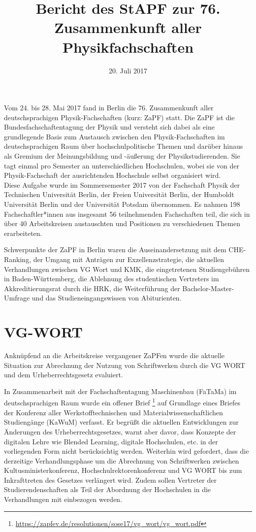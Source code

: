 \documentclass[a4paper]{article}
\begin{document}
	
\title{Bericht des StAPF zur 76. Zusammenkunft aller Physikfachschaften}
\date{20. Juli 2017}

\maketitle

Vom 24. bis 28. Mai 2017 fand in Berlin die 76. Zusammenkunft
aller deutschsprachigen Physik-Fachschaften (kurz: ZaPF) statt.  Die ZaPF ist
die Bundesfachschaftentagung der Physik und versteht sich dabei als eine
grundlegende Basis zum Austausch zwischen den Physik-Fachschaften im
deutschsprachigen Raum über hochschulpolitische Themen und darüber hinaus als
Gremium der Meinungsbildung und -äußerung der Physikstudierenden. Sie tagt
einmal pro Semester an unterschiedlichen Hochschulen, wobei sie von der
Physik-Fachschaft der ausrichtenden Hochschule selbst organisiert wird. 
\\

Diese Aufgabe wurde im Sommersemester 2017 von der Fachschaft Physik der Technischen Universität Berlin, der Freien Universität Berlin, der Humboldt Universität Berlin und der Universität Potsdam übernommen. 
Es nahmen 198 Fachschaftler*innen aus insgesamt 56 teilnehmenden Fachschaften teil, 
die sich in über 40 Arbeitskreisen austauschten und Positionen zu verschiedenen Themen erarbeiteten.

Schwerpunkte der ZaPF in Berlin waren die Auseinandersetzung mit dem CHE-Ranking, der Umgang mit Anträgen zur Exzellenzstrategie, die aktuellen Verhandlungen zwischen VG Wort und KMK, die eingetretenen Studiengebühren in Baden-Württemberg, die Ablehnung des studentischen Vertreters im Akkreditierungsrat durch die HRK, 
die Weiterführung der Bachelor-Master-Umfrage und das Studieneingangswissen von Abiturienten.

\newpage

\section*{VG-WORT}
Anknüpfend an die Arbeitskreise vergangener ZaPFen wurde die aktuelle Situation zur Abrechnung der Nutzung von Schriftwerken durch die VG WORT und dem Urheberrechtsgesetz evaluiert. 

In Zusammenarbeit mit der Fachschaftentagung Maschinenbau (FaTaMa) im deutschsprachigen Raum wurde ein offener Brief \footnote{\href{https://zapfev.de/resolutionen/sose17/vg_wort/vg_wort.pdf}{\url{https://zapfev.de/resolutionen/sose17/vg_wort/vg_wort.pdf}}} auf Grundlage eines Briefes der Konferenz aller Werkstofftechnischen und Materialwissenschaftlichen Studiengänge (KaWuM) verfasst. Er begrüßt die aktuellen Entwicklungen zur Änderungen des Urheberrechtsgesetzes, warnt aber davor, dass Konzepte der digitalen Lehre wie Blended Learning, digitale Hochschulen, etc. in der vorliegenden Form nicht berücksichtig werden. Weiterhin wird gefordert, dass die derzeitige Verhandlungsphase um die Abrechnung von Schriftwerken zwischen Kultusministerkonferenz, Hochschulrektorenkonferenz und VG WORT bis zum Inkrafttreten des Gesetzes verlängert wird. Zudem sollen Vertreter der Studierendenschaften als Teil der Abordnung der Hochschulen in die Verhandlungen mit einbezogen werden.
\end{document}
